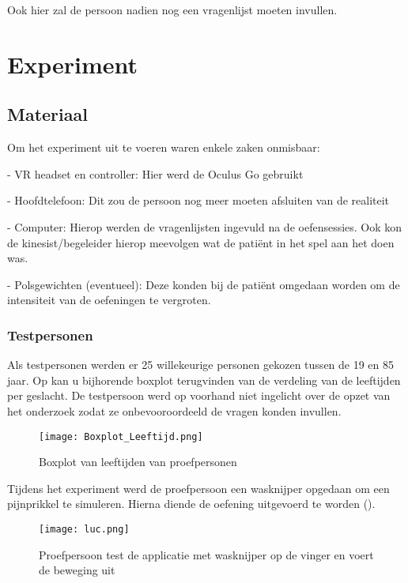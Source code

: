 Ook hier zal de persoon nadien nog een vragenlijst moeten invullen.

\chapter{Experiment}

\section{Materiaal}
Om het experiment uit te voeren waren enkele zaken onmisbaar:

- VR headset en controller: Hier werd de Oculus Go gebruikt

- Hoofdtelefoon: Dit zou de persoon nog meer moeten afsluiten van de realiteit

- Computer: Hierop werden de vragenlijsten ingevuld na de oefensessies. Ook kon de kinesist/begeleider hierop meevolgen wat de patiënt in het spel aan het doen was.

- Polsgewichten (eventueel): Deze konden bij de patiënt omgedaan worden om de intensiteit van de oefeningen te vergroten.

\newpage
\subsection{Testpersonen}
Als testpersonen werden er 25 willekeurige personen gekozen tussen de 19 en 85 jaar. Op \cite{figuur 6.1} kan u bijhorende boxplot terugvinden van de verdeling van de leeftijden per geslacht. De testpersoon werd op voorhand niet ingelicht over de opzet van het onderzoek zodat ze onbevooroordeeld de vragen konden invullen.

\begin{figure}[h]
    \centering
    \texttt{[image: Boxplot\_Leeftijd.png]}
    \caption{Boxplot van leeftijden van proefpersonen}
\end{figure}

Tijdens het experiment werd de proefpersoon een wasknijper opgedaan om een pijnprikkel te simuleren. Hierna diende de oefening uitgevoerd te worden (\cite{figuur 6.2}).

\begin{figure}[h]
    \centering
    \texttt{[image: luc.png]}
    \caption{Proefpersoon test de applicatie met wasknijper op de vinger en voert de beweging uit}
\end{figure}

\newpage

